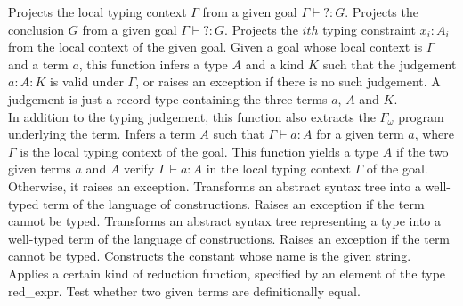 \begin{description}
    {Projects the local typing context $\Gamma$ from a given goal $\Gamma\vdash ?:G$.} 
    {Projects the conclusion $G$ from a given goal $\Gamma\vdash ?:G$.}
    {Projects the $ith$ typing constraint $x_i:A_i$ from the local
     context of the given goal.}
    {Given a goal whose local context is $\Gamma$ and a term $a$, this
     function infers a type $A$ and a kind $K$ such that the judgement
     $a:A:K$ is valid under $\Gamma$, or raises an exception if there
     is no such judgement. A judgement is just a record type containing
     the three terms $a$, $A$ and $K$.}
    {\\ In addition to the typing judgement, this function also extracts 
     the $F_{\omega}$ program underlying the term.}
    {Infers a term $A$ such that $\Gamma\vdash a:A$ for a given term
    $a$, where $\Gamma$ is the local typing context of the goal.}
    {This function yields a type $A$ if the two given terms $a$ and $A$  verify $\Gamma\vdash
     a:A$ in the local typing context $\Gamma$ of the goal. Otherwise,
    it raises an exception.}
    {Transforms an abstract syntax tree into a well-typed term of the
    language of constructions. Raises an exception if the term cannot
    be typed.}
    {Transforms an abstract syntax tree representing a type into
    a well-typed term of the language of constructions. Raises an
    exception if the term cannot be typed.}
    {Constructs the constant whose name is the given string.}
    {\\ Applies a certain kind of reduction function, specified by an
     element of the type red\_expr.}
    {Test whether  two given terms are definitionally equal.}
\end{description}

